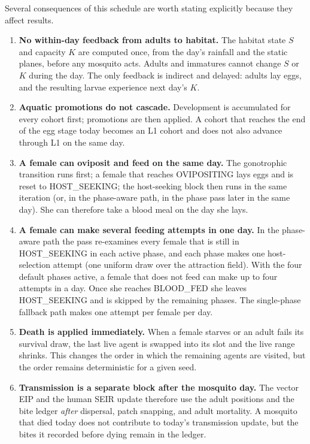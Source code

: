 \documentclass[11pt,a4paper]{article}
\begin{document}
Several consequences of this schedule are worth stating explicitly
because they affect results.

\begin{enumerate}
\item \textbf{No within-day feedback from adults to habitat.} The habitat
  state $S$ and capacity $K$ are computed once, from the day's rainfall
  and the static planes, before any mosquito acts. Adults and immatures
  cannot change $S$ or $K$ during the day. The only feedback is indirect
  and delayed: adults lay eggs, and the resulting larvae experience next
  day's $K$.
\item \textbf{Aquatic promotions do not cascade.} Development is
  accumulated for every cohort first; promotions are then applied. A
  cohort that reaches the end of the egg stage today becomes an L1
  cohort and does not also advance through L1 on the same day.
\item \textbf{A female can oviposit and feed on the same day.} The
  gonotrophic transition runs first; a female that reaches
  OVIPOSITING lays eggs and is reset to HOST\_SEEKING; the host-seeking
  block then runs in the same iteration (or, in the phase-aware path, in
  the phase pass later in the same day). She can therefore take a blood
  meal on the day she lays.
\item \textbf{A female can make several feeding attempts in one day.} In
  the phase-aware path the pass re-examines every female that is still
  in HOST\_SEEKING in each active phase, and each phase makes one
  host-selection attempt (one uniform draw over the attraction field).
  With the four default phases active, a female that does not feed can
  make up to four attempts in a day. Once she reaches BLOOD\_FED she
  leaves HOST\_SEEKING and is skipped by the remaining phases. The
  single-phase fallback path makes one attempt per female per day.
\item \textbf{Death is applied immediately.} When a female starves or an
  adult fails its survival draw, the last live agent is swapped into its
  slot and the live range shrinks. This changes the order in which the
  remaining agents are visited, but the order remains deterministic for
  a given seed.
\item \textbf{Transmission is a separate block after the mosquito day.}
  The vector EIP and the human SEIR update therefore use the adult
  positions and the bite ledger \emph{after} dispersal, patch snapping,
  and adult mortality. A mosquito that died today does not contribute to
  today's transmission update, but the bites it recorded before dying
  remain in the ledger.
\end{enumerate}
\end{document}
